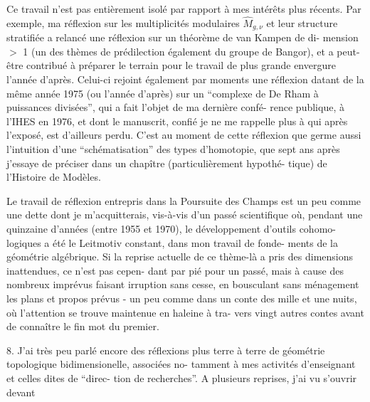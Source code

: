 
Ce travail n'est pas entièrement isolé par rapport à
mes intérêts plus récents. Par exemple, ma réflexion sur les
multiplicités modulaires $\widehat{M}_{g,\nu}$ et leur structure stratifiée
a relancé une réflexion sur un théorème de van Kampen de di-%
mension $>$ 1 (un des thèmes de prédilection également du groupe
de Bangor), et a peut-être contribué à préparer le terrain pour
le travail de plus grande envergure l'année d'après. Celui-ci
rejoint également par moments une réflexion datant de la même
année 1975 (ou l'année d'après) sur un ``complexe de De Rham à
puissances divisées'', qui a fait l'objet de ma dernière confé-%
rence publique, à l'IHES en 1976, et dont le manuscrit, confié
je ne me rappelle plus à qui après l'exposé, est d'ailleurs perdu.
C'est au moment de cette réflexion que germe aussi l'intuition
d'une ``schématisation'' des types d'homotopie, que sept ans après
j'essaye de préciser dans un chapître (particulièrement hypothé-%
tique) de l'Histoire de Modèles.

Le travail de réflexion entrepris dans la Poursuite
des Champs est un peu comme une dette dont je m'acquitterais,
vis-à-vis d'un passé scientifique où, pendant une quinzaine
d'années (entre 1955 et 1970), le développement d'outils cohomo-%
logiques a été le Leitmotiv constant, dans mon travail de fonde-%
ments de la géométrie algébrique. Si la reprise actuelle de ce
thème-là a pris des dimensions inattendues, ce n'est pas cepen-%
dant par pié pour un passé, mais à cause des nombreux imprévus
faisant irruption sans cesse, en bousculant sans ménagement les
plans et propos prévus - un peu comme dans un conte des mille et
une nuits, où l'attention se trouve maintenue en haleine à tra-%
vers vingt autres contes avant de connaître le fin mot du premier.


8. J'ai très peu parlé encore des réflexions plus terre
à terre de géométrie topologique bidimensionelle, associées no-%
tamment à mes activités d'enseignant et celles dites de ``direc-%
tion de recherches''. A plusieurs reprises, j'ai vu s'ouvrir devant

